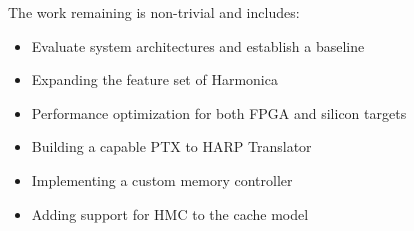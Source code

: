The work remaining is non-trivial and includes:

\begin{itemize}
  \item Evaluate system architectures and establish a baseline
  \item Expanding the feature set of Harmonica
  \item Performance optimization for both FPGA and silicon targets
  \item Building a capable PTX to HARP Translator
  \item Implementing a custom memory controller
  \item Adding support for HMC to the cache model
\end{itemize}
